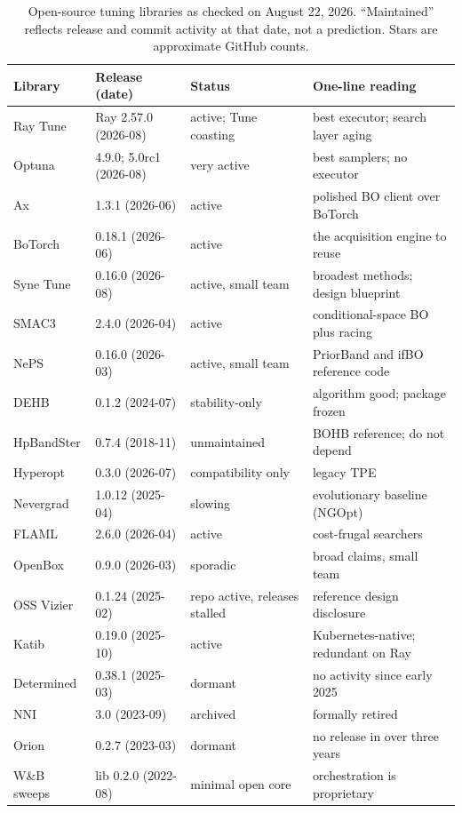 \begin{table}[t]
\centering
\small
\caption{Open-source tuning libraries as checked on August 22, 2026.
``Maintained'' reflects release and commit activity at that date, not a
prediction. Stars are approximate GitHub counts.}
\label{tab:libraries}
\begin{tabular}{@{}llll@{}}
\toprule
Library & Release (date) & Status & One-line reading \\
\midrule
Ray Tune & Ray 2.57.0 (2026-08) & active; Tune coasting & best executor; search layer aging \\
Optuna & 4.9.0; 5.0rc1 (2026-08) & very active & best samplers; no executor \\
Ax & 1.3.1 (2026-06) & active & polished BO client over BoTorch \\
BoTorch & 0.18.1 (2026-06) & active & the acquisition engine to reuse \\
Syne Tune & 0.16.0 (2026-08) & active, small team & broadest methods; design blueprint \\
SMAC3 & 2.4.0 (2026-04) & active & conditional-space BO plus racing \\
NePS & 0.16.0 (2026-03) & active, small team & PriorBand and ifBO reference code \\
DEHB & 0.1.2 (2024-07) & stability-only & algorithm good; package frozen \\
HpBandSter & 0.7.4 (2018-11) & unmaintained & BOHB reference; do not depend \\
Hyperopt & 0.3.0 (2026-07) & compatibility only & legacy TPE \\
Nevergrad & 1.0.12 (2025-04) & slowing & evolutionary baseline (NGOpt) \\
FLAML & 2.6.0 (2026-04) & active & cost-frugal searchers \\
OpenBox & 0.9.0 (2026-03) & sporadic & broad claims, small team \\
OSS Vizier & 0.1.24 (2025-02) & repo active, releases stalled & reference design disclosure \\
Katib & 0.19.0 (2025-10) & active & Kubernetes-native; redundant on Ray \\
Determined & 0.38.1 (2025-03) & dormant & no activity since early 2025 \\
NNI & 3.0 (2023-09) & archived & formally retired \\
Orion & 0.2.7 (2023-03) & dormant & no release in over three years \\
W\&B sweeps & lib 0.2.0 (2022-08) & minimal open core & orchestration is proprietary \\
\bottomrule
\end{tabular}
\end{table}
